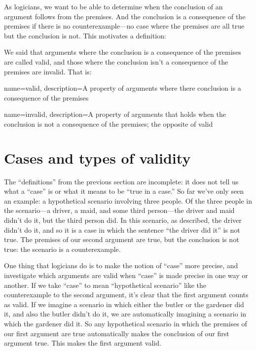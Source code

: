 As logicians, we want to be able to determine when the conclusion of an argument follows from the premises. And the conclusion is a consequence of the premises if there is no counterexample---no case where the premises are all true but the conclusion is not.
This motivates a definition:


We said that arguments where the conclusion is a consequence of the premises are called valid, and those where the conclusion isn't a consequence of the premises are invalid. That is:



{
name=valid,
description={A property of arguments where there conclusion is a consequence of the premises}
}

{
name=invalid,
description={A property of arguments that holds when the conclusion is not a consequence of the premises; the opposite of \gls{valid}}
}

\section{Cases and types of validity}
The ``definitions'' from the previous section are incomplete: it does not tell us what a ``case'' is or what it means to be ``true in a case.''  So far we've only seen an example: a hypothetical scenario involving three people. Of the three people in the scenario---a driver, a maid, and some third person---the driver and maid didn't do it, but the third person did. In this scenario, as described, the driver didn't do it, and so it is a case in which the sentence ``the driver did it'' is not true. The premises of our second argument are true, but the conclusion is not true: the scenario is a counterexample.

One thing that logicians do is to make the notion of ``case'' more precise, and investigate which arguments are valid when ``case'' is made precise in one way or another. If we take ``case'' to mean ``hypothetical scenario'' like the counterexample to the second argument, it's clear that the first argument counts as valid. If we imagine a scenario in which either the butler or the gardener did it, and also the butler didn't do it, we are automatically imagining a scenario in which the gardener did it. So any hypothetical scenario in which the premises of our first argument are true automatically makes the conclusion of our first argument true. This makes the first argument valid.

